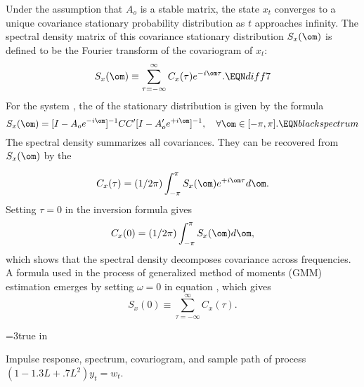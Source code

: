  Under the assumption that
$A_o$ is a stable matrix,
 the state $x_t$ converges
 to a unique covariance stationary probability distribution as
$t$ approaches infinity.
The spectral density matrix of this covariance stationary
distribution $S_x(\om)$ is  defined to be
the Fourier transform of the covariogram of $x_t$:
$$S_x(\om) \equiv \sum_{\tau=-\infty}^{\infty}
C_x (\tau) e^{-i\om\tau}. \EQN diff7 $$
  For the system , the
 of the stationary  distribution
 is given by the formula
$$ S_x(\om) = [I-A_o e^{-i\om}]^{-1}C  C' [I-A_o'
e^{+i\om}]^{-1},  \quad \forall
   \om \in[-\pi,\pi].  \EQN blackspectrum $$
The spectral density summarizes all
covariances.  They can be recovered from $S_x(\om)$ by the

$$C_x(\tau) =(1/2\pi)\int_{-\pi}^\pi S_x(\om) e^{+i\om\tau} d\om.$$
%
%
%
 Setting $\tau=0$ in the inversion formula gives
$$C_x(0) =(1/2\pi)\int_{-\pi}^\pi S_x(\om)  d\om,$$
which shows that the spectral
density  decomposes covariance across
 frequencies.
A formula used  in the process
of generalized method of moments (GMM) estimation
emerges by  setting $\omega=0$ in equation , which gives
$$S_x(0) \equiv \sum_{\tau=-\infty}^{\infty}
C_x (\tau) .  $$  \centerline{\epsfxsize=3true
in} \caption{Impulse response, spectrum,
covariogram, and sample path of process $(1 - 1.3L + .7L^2) y_t =
w_t $.} 
\endfigure

\vfill\eject






